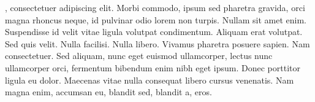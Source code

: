 \justifying

, consectetuer adipiscing elit. Morbi commodo, ipsum sed pharetra gravida, orci magna rhoncus neque, id pulvinar odio lorem non turpis. Nullam sit amet enim. Suspendisse id velit vitae ligula volutpat condimentum. Aliquam erat volutpat. Sed quis velit. Nulla facilisi. Nulla libero. Vivamus pharetra posuere sapien. Nam consectetuer. Sed aliquam, nunc eget euismod ullamcorper, lectus nunc ullamcorper orci, fermentum bibendum enim nibh eget ipsum. Donec porttitor ligula eu dolor. Maecenas vitae nulla consequat libero cursus venenatis. Nam magna enim, accumsan eu, blandit sed, blandit a, eros.